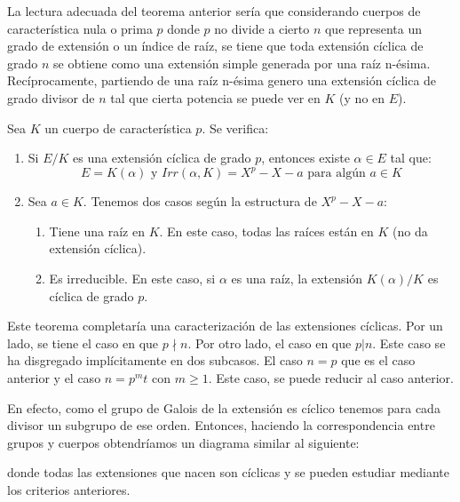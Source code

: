 La lectura adecuada del teorema anterior sería que considerando cuerpos de característica nula o prima $p$ donde $p$ no divide a cierto $n$ que representa un grado de extensión o un índice de raíz, se tiene que toda extensión cíclica de grado $n$ se obtiene como una extensión simple generada por una raíz n-ésima. Recíprocamente, partiendo de una raíz n-ésima genero una extensión cíclica de grado divisor de $n$ tal que cierta potencia se puede ver en $K$ (y no en $E$).

\begin{theorem}
Sea $K$ un cuerpo de característica $p$. Se verifica:

\begin{enumerate}
\item Si $E/K$ es una extensión cíclica de grado $p$, entonces existe $\alpha \in E$ tal que: $$E = K(\alpha) \text{ y } Irr(\alpha,K) = X^p-X-a \text{ para algún } a \in K$$ 
\item Sea $a \in K$. Tenemos dos casos según la estructura de $X^p-X-a$:

\begin{enumerate}
\item Tiene una raíz en $K$. En este caso, todas las raíces están en $K$ (no da extensión cíclica).
\item Es irreducible. En este caso, si $\alpha$ es una raíz, la extensión $K(\alpha)/K$ es cíclica de grado $p$.
\end{enumerate}
\end{enumerate}
\end{theorem}

Este teorema completaría una caracterización de las extensiones cíclicas. Por un lado, se tiene el caso en que $p \nmid n$. Por otro lado, el caso en que $p|n$. Este caso se ha disgregado implícitamente en dos subcasos. El caso $n = p$ que es el caso anterior y el caso $n = p^mt$ con $m \ge 1$. Este caso, se puede reducir al caso anterior.

En efecto, como el grupo de Galois de la extensión es cíclico tenemos para cada divisor un subgrupo de ese orden. Entonces, haciendo la correspondencia entre grupos y cuerpos obtendríamos un diagrama similar al siguiente:


donde todas las extensiones que nacen son cíclicas y se pueden estudiar mediante los criterios anteriores. 









